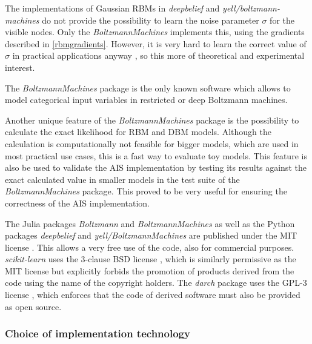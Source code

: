 \documentclass[12pt]{article}
\newcommand{\apkg}[1]{\emph{#1}}
\begin{document}
The implementations of Gaussian RBMs in \apkg{deepbelief} and \apkg{yell/boltzmann-machines} do not provide the possibility to learn the noise parameter $\sigma$ for the visible nodes.
Only the \apkg{BoltzmannMachines} implements this, using the gradients described in \ref{rbmgradients}.
However, it is very hard to learn the correct value of $\sigma$ in practical applications anyway \citep{hinton_practical_2012}, so this more of theoretical and experimental interest.

The \apkg{BoltzmannMachines} package is the only known software which allows to model categorical input variables in restricted or deep Boltzmann machines.

Another unique feature of the \apkg{BoltzmannMachines} package is the possibility to calculate the exact likelihood for RBM and DBM models.
Although the calculation is computationally not feasible for bigger models, which are used in most practical use cases, this is a fast way to evaluate toy models.
This feature is also be used to validate the AIS implementation by testing its results against the exact calculated value in smaller models in the test suite of the \apkg{BoltzmannMachines} package.
This proved to be very useful for ensuring the correctness of the AIS implementation.


The Julia packages \apkg{Boltzmann} and \apkg{BoltzmannMachines} as well as the Python packages \apkg{deepbelief} and \apkg{yell/BoltzmannMachines} are published under the MIT license \citep{mitlicense}.
This allows a very free use of the code, also for commercial purposes.
\apkg{scikit-learn} uses the 3-clause BSD license \citep{bsd3}, which is similarly permissive as the MIT license but explicitly forbids the promotion of products derived from the code using the name of the copyright holders.
The \apkg{darch} package uses the GPL-3 license \citep{gplv3}, which enforces that the code of derived software must also be provided as open source.



\subsubsection{Choice of implementation technology}
\end{document}
